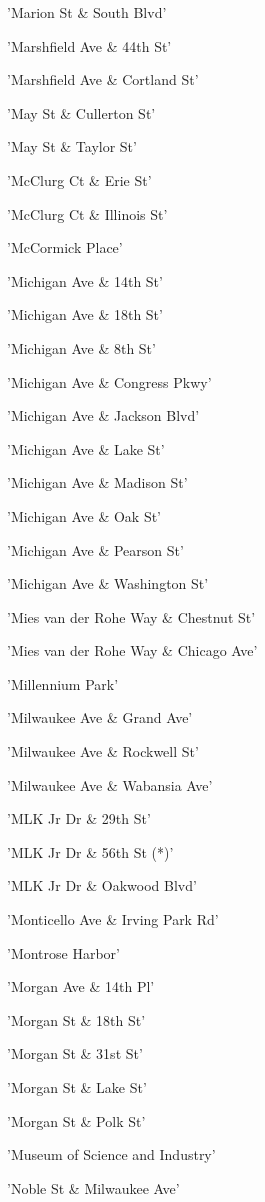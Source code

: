 \documentclass[11pt]{article}
\begin{document}
\begin{enumerate*}
\item 'Marion St \& South Blvd'
\item 'Marshfield Ave \& 44th St'
\item 'Marshfield Ave \& Cortland St'
\item 'May St \& Cullerton St'
\item 'May St \& Taylor St'
\item 'McClurg Ct \& Erie St'
\item 'McClurg Ct \& Illinois St'
\item 'McCormick Place'
\item 'Michigan Ave \& 14th St'
\item 'Michigan Ave \& 18th St'
\item 'Michigan Ave \& 8th St'
\item 'Michigan Ave \& Congress Pkwy'
\item 'Michigan Ave \& Jackson Blvd'
\item 'Michigan Ave \& Lake St'
\item 'Michigan Ave \& Madison St'
\item 'Michigan Ave \& Oak St'
\item 'Michigan Ave \& Pearson St'
\item 'Michigan Ave \& Washington St'
\item 'Mies van der Rohe Way \& Chestnut St'
\item 'Mies van der Rohe Way \& Chicago Ave'
\item 'Millennium Park'
\item 'Milwaukee Ave \& Grand Ave'
\item 'Milwaukee Ave \& Rockwell St'
\item 'Milwaukee Ave \& Wabansia Ave'
\item 'MLK Jr Dr \& 29th St'
\item 'MLK Jr Dr \& 56th St (*)'
\item 'MLK Jr Dr \& Oakwood Blvd'
\item 'Monticello Ave \& Irving Park Rd'
\item 'Montrose Harbor'
\item 'Morgan Ave \& 14th Pl'
\item 'Morgan St \& 18th St'
\item 'Morgan St \& 31st St'
\item 'Morgan St \& Lake St'
\item 'Morgan St \& Polk St'
\item 'Museum of Science and Industry'
\item 'Noble St \& Milwaukee Ave'

\end{enumerate*}
\end{document}
